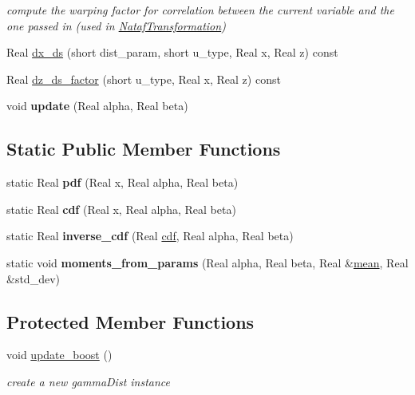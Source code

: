 \begin{DoxyCompactItemize}
\begin{DoxyCompactList}\small\item\em compute the warping factor for correlation between the current variable and the one passed in (used in \hyperlink{classPecos_1_1NatafTransformation}{Nataf\+Transformation}) \end{DoxyCompactList}\item 
Real \hyperlink{classPecos_1_1GammaRandomVariable_af889af8adfb262c9b74f573b2a9ffc99}{dx\+\_\+ds} (short dist\+\_\+param, short u\+\_\+type, Real x, Real z) const 
\item 
Real \hyperlink{classPecos_1_1GammaRandomVariable_af6b5fc528523180bed5fc3008dcea205}{dz\+\_\+ds\+\_\+factor} (short u\+\_\+type, Real x, Real z) const 
\item 
void {\bfseries update} (Real alpha, Real beta)\label{classPecos_1_1GammaRandomVariable_aaa82eccfdca4d440a4e2d4a890b0d9ed}

\end{DoxyCompactItemize}
\subsection*{Static Public Member Functions}
\begin{DoxyCompactItemize}
\item 
static Real {\bfseries pdf} (Real x, Real alpha, Real beta)\label{classPecos_1_1GammaRandomVariable_a739d94cef9ee188f00056e229ca3fd95}

\item 
static Real {\bfseries cdf} (Real x, Real alpha, Real beta)\label{classPecos_1_1GammaRandomVariable_a6ccc276bca2bfdfd6f320c65a6c8aaf7}

\item 
static Real {\bfseries inverse\+\_\+cdf} (Real \hyperlink{classPecos_1_1GammaRandomVariable_addd564e7f4f314e12d38df74d845f0d8}{cdf}, Real alpha, Real beta)\label{classPecos_1_1GammaRandomVariable_a2e77b37ec653326d8c6189a646b8db7b}

\item 
static void {\bfseries moments\+\_\+from\+\_\+params} (Real alpha, Real beta, Real \&\hyperlink{classPecos_1_1GammaRandomVariable_a962ffe5a3593be370d5c883365c060f4}{mean}, Real \&std\+\_\+dev)\label{classPecos_1_1GammaRandomVariable_af6459b831a8e62a41f7eab34d06edad8}

\end{DoxyCompactItemize}
\subsection*{Protected Member Functions}
\begin{DoxyCompactItemize}
\item 
void \hyperlink{classPecos_1_1GammaRandomVariable_aaa6750cbee2245416a6eeeac58d4405a}{update\+\_\+boost} ()\label{classPecos_1_1GammaRandomVariable_aaa6750cbee2245416a6eeeac58d4405a}

\begin{DoxyCompactList}\small\item\em create a new gamma\+Dist instance \end{DoxyCompactList}\end{DoxyCompactItemize}
